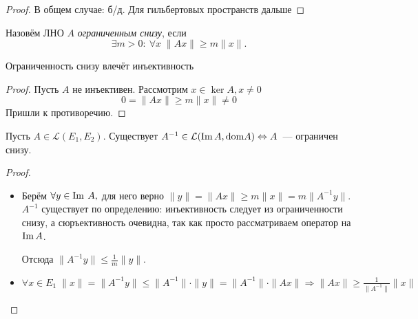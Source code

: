 \begin{proof}
    В общем случае: б/д. Для гильбертовых пространств дальше
\end{proof}

\begin{definition}[Усиление условия $\ker A = \{0\}$]
    Назовём ЛНО $A$ \textit{ограниченным снизу}, если
    \[\exists m > 0\!:\: \forall x \; \|Ax\| \geqslant m \|x\|.\]
\end{definition}

\begin{note}
    Ограниченность снизу влечёт инъективность
\end{note}

\begin{proof}
    Пусть $A$ не инъективен. Рассмотрим $x \in \ker A, x \neq 0$
        \[ 0 = \| Ax \| \geq m \| x \| \neq 0 \]
    Пришли к противоречию.
\end{proof}

\begin{theorem}[8.1]\label{8.1}
    Пусть $A \in \mathcal{L}(E_1, E_2)$. Существует $A^{-1} \in \mathcal{L}(\operatorname{Im} A, \text{dom}A) \Leftrightarrow A$~--- ограничен снизу.
\end{theorem}

\begin{proof}
    \begin{itemize}
        \item[$\Leftarrow$]
        Берём $\forall y \in \operatorname{Im}\: A,$ для него верно \(\|y\| = \|Ax\| \geqslant m \|x\| = m \|A^{-1}y\|\). $A^{-1}$ существует по определению: инъективность следует из ограниченности снизу, а сюръективность очевидна, так как просто рассматриваем оператор на $\operatorname{Im} A$.
        
        Отсюда $\|A^{-1} y\| \leqslant \frac{1}{m} \|y\|$.
        \item[$\Rightarrow$]
        \( \forall x \in E_1 \; \|x\|=\|A^{-1} y\| \leqslant \| A^{-1}\| \cdot \|y\|=\|A^{-1}\| \cdot \|Ax\| \Rightarrow \|Ax\| \geqslant \frac{1}{\|A^{-1}\|}\|x\| \)
    \end{itemize}
\end{proof}
\newpage